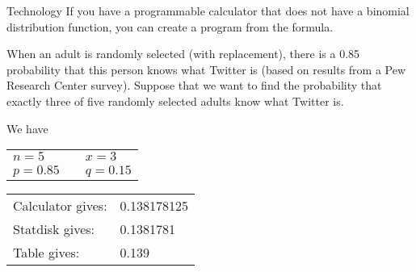 \documentclass{beamer}
\begin{document}
\begin{frame}
\begin{block}{Technology}
If you have a programmable calculator that does not have a binomial distribution function, you can create a program from the formula.
\end{block}\pause

\begin{example}
When an adult is randomly selected (with replacement), there is a 0.85 probability that this person knows what Twitter is (based on results from a Pew Research Center survey). Suppose that we want to find the probability that exactly three of five randomly selected adults know what Twitter is.\pause

\vspace{1mm}
We have
\begin{center}
\begin{tabular}{lcl}
$n = 5$ &\quad& $x = 3$ \\
$p = 0.85$ &\quad& $q = 0.15$
\end{tabular}
\end{center}\pause

\begin{center}
\begin{tabular}{ll}
Calculator gives: & 0.138178125 \\
Statdisk gives: & 0.1381781 \\
Table gives: & 0.139
\end{tabular}
\end{center}
\end{example}
\end{frame}
\end{document}
